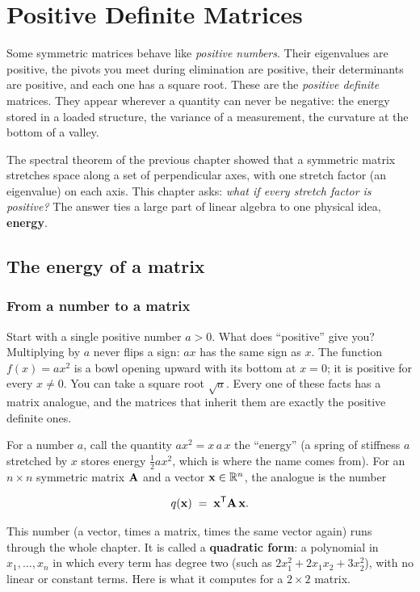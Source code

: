 \chapter{Positive Definite Matrices}

Some symmetric matrices behave like \emph{positive numbers}. Their eigenvalues are positive, the
pivots you meet during elimination are positive, their determinants are positive, and each one has a
square root. These are the \emph{positive definite} matrices. They appear wherever a quantity can
never be negative: the energy stored in a loaded structure, the variance of a measurement, the
curvature at the bottom of a valley.

The spectral theorem of the previous chapter showed that a symmetric matrix stretches space along a
set of perpendicular axes, with one stretch factor (an eigenvalue) on each axis. This chapter asks:
\emph{what if every stretch factor is positive?} The answer ties a large part of linear algebra to
one physical idea, \textbf{energy}.

\section{The energy of a matrix}

\subsection{From a number to a matrix}

Start with a single positive number $a > 0$. What does ``positive'' give you?
Multiplying by $a$ never flips a sign: $a x$ has the same sign as $x$. The function $f(x) = a x^2$
is a bowl opening upward with its bottom at $x = 0$; it is positive for every $x \neq 0$. You can
take a square root $\sqrt{a}$. Every one of these facts has a matrix analogue, and the matrices that
inherit them are exactly the positive definite ones.

For a number $a$, call the quantity $a x^2 = x \, a \, x$ the ``energy'' (a spring of stiffness $a$
stretched by $x$ stores energy $\tfrac12 a x^2$, which is where the name comes from). For an
$n \times n$ symmetric matrix $\mathbf{A}$ and a vector $\mathbf{x} \in \mathbb{R}^n$, the analogue is the number

\[
  q(\mathbf{x}) \;=\; \mathbf{x}^{\mathsf{T}} \mathbf{A}\, \mathbf{x}.
\]

This number (a vector, times a matrix, times the same vector again) runs through the whole chapter.
It is called a \textbf{quadratic form}: a polynomial in $x_1,\dots,x_n$ in which every term has
degree two (such as $2x_1^2 + 2x_1 x_2 + 3x_2^2$), with no linear or constant terms. Here is what it
computes for a $2\times 2$ matrix.

